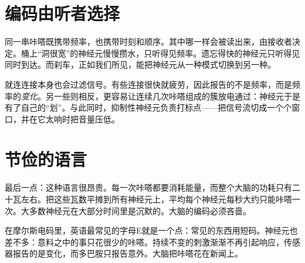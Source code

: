 \section*{编码由听者选择}

同一串咔嗒既携带频率，也携带时刻和顺序。其中哪一样会被读出来，由接收者决定。桶上“洞很宽”的神经元慢慢攒水，只听得见频率。遗忘得快的神经元只听得见同时到达。而刹车，正如我们所见，能把神经元从一种模式切换到另一种。

就连连接本身也会过滤信号。有些连接很快就疲劳，因此报告的不是频率，而是频率的\emph{变化}。另一些则相反，更容易让连续几次咔嗒组成的簇放电通过：神经元于是有了自己的“划”。与此同时，抑制性神经元负责打标点——把信号流切成一个个窗口，并在它太响时把音量压低。

\section*{节俭的语言}

最后一点：这种语言很昂贵。每一次咔嗒都要消耗能量，而整个大脑的功耗只有二十瓦左右。把这些瓦数平摊到所有神经元上，平均每个神经元每秒大约只能咔嗒一次。大多数神经元在大部分时间里是沉默的。大脑的编码必须吝啬。

在摩尔斯电码里，英语最常见的字母E就是一个点：常见的东西用短码。神经元也差不多：意料之中的事只花很少的咔嗒。持续不变的刺激渐渐不再引起响应，传感器报告的是变化，而多巴胺只报告意外。大脑把咔嗒花在新闻上。

